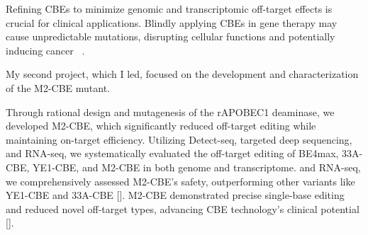 \documentclass[12pt]{article}
\begin{document}


Refining CBEs to minimize genomic and transcriptomic off-target effects is crucial for clinical applications. 
Blindly applying CBEs in gene therapy may cause unpredictable mutations, disrupting cellular functions and 
potentially inducing cancer ~\cite{lei2021detect,rao2023characterizing}.

My second project, which I led, focused on the development and characterization of the M2-CBE mutant. 
  
Through rational design and mutagenesis of the rAPOBEC1 deaminase, 
we developed M2-CBE, which significantly reduced off-target editing while maintaining on-target efficiency. 
Utilizing Detect-seq, targeted deep sequencing, and RNA-seq, 
we systematically evaluated the off-target editing of BE4max, 33A-CBE, YE1-CBE, and M2-CBE in both genome and transcriptome.
and RNA-seq, we comprehensively assessed M2-CBE's safety, outperforming other variants like YE1-CBE and 33A-CBE [\cite{lei2021, lei2022}]. 
M2-CBE demonstrated precise single-base editing and reduced novel off-target types, advancing CBE technology's clinical potential [\cite{lei2022}].
\end{document}

